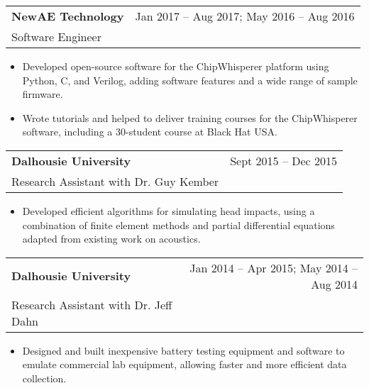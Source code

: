 \documentclass{article}
\begin{document}
\begin{center}
\begin{tabularx}{\textwidth}{Xr}
	\textbf{NewAE Technology}		& Jan 2017 -- Aug 2017; May 2016 -- Aug 2016 \\
	Software Engineer
\end{tabularx}
\end{center}
\begin{itemize}
	\item Developed open-source software for the ChipWhisperer platform using Python, C, and Verilog, adding software features and a wide range of sample firmware.
	\item Wrote tutorials and helped to deliver training courses for the ChipWhisperer software, including a 30-student course at Black Hat USA.
\end{itemize}

\begin{center}
\begin{tabularx}{\textwidth}{Xr}
	\textbf{Dalhousie University}	& Sept 2015 -- Dec 2015 \\
	Research Assistant with Dr. Guy Kember
\end{tabularx}
\end{center}
\begin{itemize}
	\item Developed efficient algorithms for simulating head impacts, using a combination of finite element methods and partial differential equations adapted from existing work on acoustics.
\end{itemize}

\begin{center}
\begin{tabularx}{\textwidth}{Xr}
	\textbf{Dalhousie University}	& 
	Jan 2014 -- Apr 2015; May 2014 -- Aug 2014 \\
	Research Assistant with Dr. Jeff Dahn
\end{tabularx}
\end{center}
\begin{itemize}
	\item Designed and built inexpensive battery testing equipment and software to emulate commercial lab equipment, allowing faster and more efficient data collection.
\end{itemize}
\end{document}
